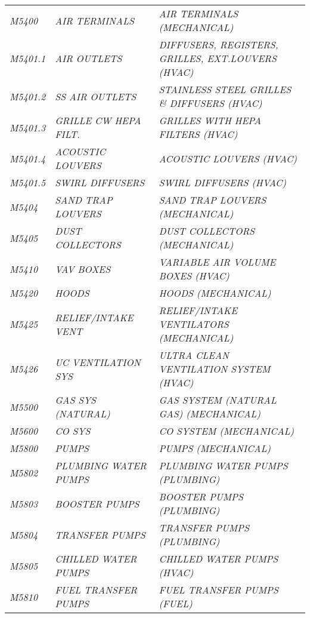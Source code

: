 \begin{landscape}
\begin{longtable}[l]{l%
                  l|%
                  l|}
\itshape M5400       &\itshape AIR TERMINALS   &\itshape AIR TERMINALS (MECHANICAL)   \\
\itshape M5401.1     &\itshape AIR OUTLETS   &\itshape DIFFUSERS, REGISTERS, GRILLES, EXT.LOUVERS (HVAC)   \\
\itshape M5401.2     &\itshape SS AIR OUTLETS   &\itshape STAINLESS STEEL GRILLES \& DIFFUSERS (HVAC)   \\
\itshape M5401.3     &\itshape GRILLE CW HEPA FILT.   &\itshape GRILLES WITH HEPA FILTERS (HVAC)   \\
\itshape M5401.4     &\itshape ACOUSTIC LOUVERS   &\itshape ACOUSTIC LOUVERS (HVAC)   \\
\itshape M5401.5     &\itshape SWIRL DIFFUSERS   &\itshape SWIRL DIFFUSERS (HVAC)   \\
\itshape M5404       &\itshape SAND TRAP LOUVERS   &\itshape SAND TRAP LOUVERS (MECHANICAL)   \\
\itshape M5405       &\itshape DUST COLLECTORS   &\itshape DUST COLLECTORS (MECHANICAL)   \\
\itshape M5410       &\itshape VAV BOXES   &\itshape VARIABLE AIR VOLUME BOXES (HVAC)   \\
\itshape M5420       &\itshape HOODS   &\itshape HOODS (MECHANICAL)   \\
\itshape M5425       &\itshape RELIEF/INTAKE VENT   &\itshape RELIEF/INTAKE VENTILATORS (MECHANICAL)   \\
\itshape M5426       &\itshape UC VENTILATION SYS   &\itshape ULTRA CLEAN VENTILATION SYSTEM (HVAC)   \\
\itshape M5500       &\itshape GAS SYS (NATURAL)   &\itshape GAS SYSTEM (NATURAL GAS) (MECHANICAL)   \\
\itshape M5600       &\itshape CO SYS   &\itshape CO SYSTEM (MECHANICAL)   \\
\itshape M5800       &\itshape PUMPS   &\itshape PUMPS (MECHANICAL)   \\
\itshape M5802       &\itshape PLUMBING WATER PUMPS   &\itshape PLUMBING WATER PUMPS (PLUMBING)   \\
\itshape M5803       &\itshape BOOSTER PUMPS   &\itshape BOOSTER PUMPS (PLUMBING)   \\
\itshape M5804       &\itshape TRANSFER PUMPS   &\itshape TRANSFER PUMPS (PLUMBING)   \\
\itshape M5805       &\itshape CHILLED WATER PUMPS   &\itshape CHILLED WATER PUMPS (HVAC)   \\
\itshape M5810       &\itshape FUEL TRANSFER PUMPS   &\itshape FUEL TRANSFER PUMPS (FUEL)   \\

\end{longtable}
\end{landscape}

